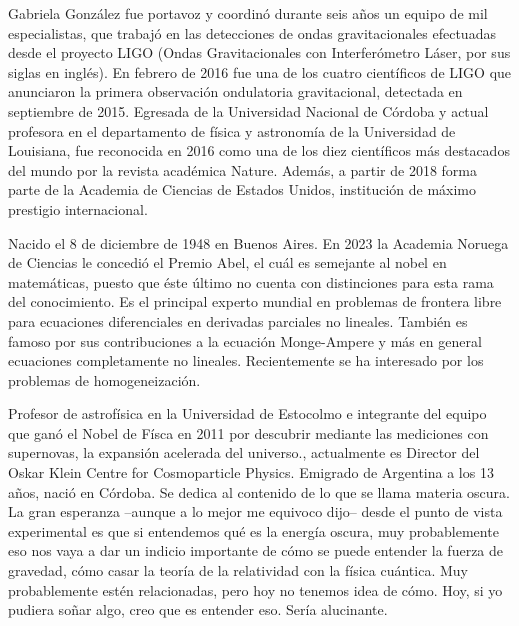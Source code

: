 \begin{parchment} {Gabriela González fue portavoz y coordinó durante seis años un equipo de mil especialistas, que trabajó en las detecciones de ondas gravitacionales efectuadas desde el proyecto LIGO (Ondas Gravitacionales con Interferómetro Láser, por sus siglas en inglés). En febrero de 2016 fue una de los cuatro científicos de LIGO que anunciaron la primera observación ondulatoria gravitacional, detectada en septiembre de 2015. Egresada de la Universidad Nacional de Córdoba y actual profesora en el departamento de física y astronomía de la Universidad de Louisiana, fue reconocida en 2016 como una de los diez científicos más destacados del mundo por la revista académica Nature. Además, a partir de 2018 forma parte de la Academia de Ciencias de Estados Unidos, institución de máximo prestigio internacional. }
\end{parchment}

\begin{parchment} {Nacido el 8 de diciembre de 1948 en Buenos Aires. En 2023 la Academia Noruega de Ciencias le concedió el Premio Abel, el cuál es semejante al nobel en matemáticas, puesto que éste último no cuenta con distinciones para esta rama del conocimiento. Es el principal experto mundial en problemas de frontera libre para ecuaciones diferenciales en derivadas parciales no lineales. También es famoso por sus contribuciones a la ecuación Monge-Ampere y más en general ecuaciones completamente no lineales. Recientemente se ha interesado por los problemas de homogeneización.}
\end{parchment}

\begin{parchment}{Profesor de astrofísica en la Universidad de Estocolmo e integrante del equipo que ganó el Nobel de Físca en 2011 por descubrir mediante las mediciones con supernovas, la expansión acelerada del universo., actualmente es Director del Oskar Klein Centre for Cosmoparticle Physics. Emigrado de Argentina a los 13 años, nació en Córdoba. Se dedica al contenido de lo que se llama materia oscura.
La gran esperanza –aunque a lo mejor me equivoco dijo– desde el punto de vista experimental es que si entendemos qué es la energía oscura, muy probablemente eso nos vaya a dar un indicio importante de cómo se puede entender la fuerza de gravedad, cómo casar la teoría de la relatividad con la física cuántica. Muy probablemente estén relacionadas, pero hoy no tenemos idea de cómo. Hoy, si yo pudiera soñar algo, creo que es entender eso. Sería alucinante. }
\end{parchment}

